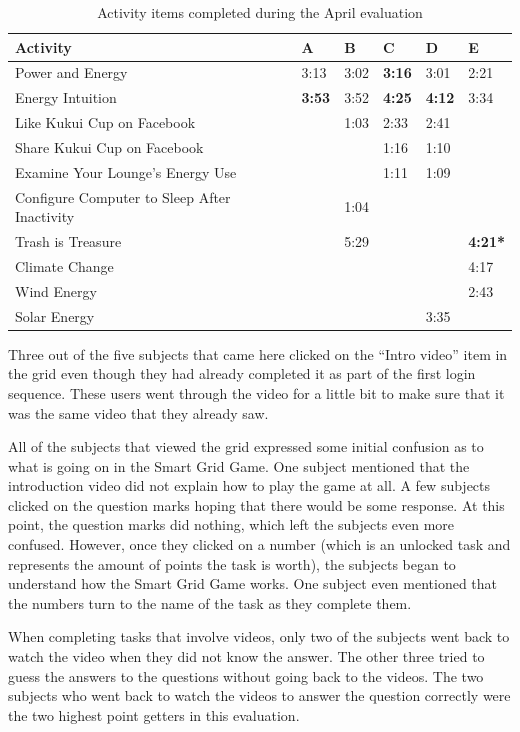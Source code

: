 \begin{table}[t]
	\begin{tabular}{| l || p{1cm} | p{1cm} | p{1cm} | p{1cm} | p{1cm} |}
		\hline
		Activity & A & B & C & D & E \\
		\hline
		Power and Energy & 3:13 & 3:02 & \bf{3:16} & 3:01 & 2:21 \\
    Energy Intuition & \bf{3:53} & 3:52 & \bf{4:25} & \bf{4:12} & 3:34 \\
    Like Kukui Cup on Facebook & & 1:03 & 2:33 & 2:41 & \\
    Share Kukui Cup on Facebook & & & 1:16 & 1:10 & \\
    Examine Your Lounge's Energy Use & & & 1:11 & 1:09 & \\
    Configure Computer to Sleep After Inactivity & & 1:04 & & &  \\
    Trash is Treasure & & 5:29 & & & \bf{4:21}* \\
    Climate Change & & & & & 4:17 \\
    Wind Energy & & & & & 2:43 \\
    Solar Energy & & & & 3:35 & \\
		\hline
	\end{tabular}
	\caption{Activity items completed during the April evaluation}
	\label{table:april-activities}
\end{table}

Three out of the five subjects that came here clicked on the ``Intro video'' item in the grid even though they had already completed it as part of the first login sequence. These users went through the video for a little bit to make sure that it was the same video that they already saw.

All of the subjects that viewed the grid expressed some initial confusion as to what is going on in the Smart Grid Game. One subject mentioned that the introduction video did not explain how to play the game at all. A few subjects clicked on the question marks hoping that there would be some response. At this point, the question marks did nothing, which left the subjects even more confused. However, once they clicked on a number (which is an unlocked task and represents the amount of points the task is worth), the subjects began to understand how the Smart Grid Game works. One subject even mentioned that the numbers turn to the name of the task as they complete them.

When completing tasks that involve videos, only two of the subjects went back to watch the video when they did not know the answer. The other three tried to guess the answers to the questions without going back to the videos. The two subjects who went back to watch the videos to answer the question correctly were the two highest point getters in this evaluation.

